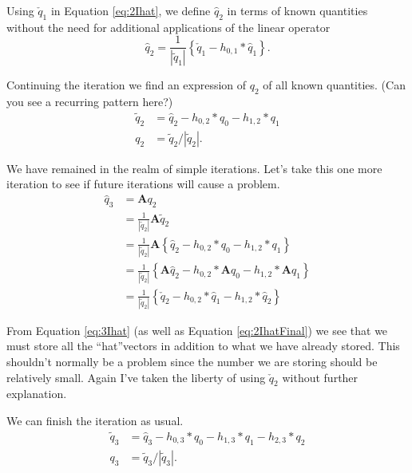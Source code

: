 \documentclass[12pt]{article}
\newcommand{\A}{\mathbf{A}}
\newcommand{\qh}[1]{\hat{q}_{#1}}
\newcommand{\qt}[1]{\tilde{q}_{#1}}
\newcommand{\qc}[1]{\check{q}_{#1}}
\newcommand{\Aq}[1]{\A q_{#1}}
\newcommand{\Ah}[1]{\A \qh{#1}}
\newcommand{\At}[1]{\A \qt{#1}}
\begin{document}
Using $\qc{1}$ in Equation \ref{eq:2Ihat}, we define $\qh{2}$ in terms of known quantities without the need for additional applications of the linear operator
\begin{equation}
    \qh{2} = \frac{1}{\left|\qt{1}\right|} \left\{\qc{1}-h_{0,1}*\qh{1}\right\} 
    \label{eq:2IhatFinal}.
\end{equation}

Continuing the iteration we find an expression of $q_2$ of all known quantities.  (Can you see a recurring pattern here?)
\begin{subequations}
    \begin{align}
        \qt{2} &= \qh{2} - h_{0,2}*q_0 - h_{1,2}*q_1 \\
        q_2 &= \qt{2}/\left|\qt{2}\right|.
    \end{align}
    \label{eq:2I}
\end{subequations}

We have remained in the realm of simple iterations.  Let's take this one more iteration to see if future iterations will cause a problem.
\begin{subequations}
    \begin{align}
    \qh{3} &= \A q_2 \\
    &= \frac{1}{\left|\qt{2}\right|}\At{2} \\
    &= \frac{1}{\left|\qt{2}\right|}\A \left\{\qh{2} - h_{0,2}*q_0 - h_{1,2}*q_1 \right\} \\
    &= \frac{1}{\left|\qt{2}\right|} \left\{\Ah{2} - h_{0,2}*\Aq{0} - h_{1,2}*\Aq{1} \right\} \\
    &= \frac{1}{\left|\qt{2}\right|} \left\{\qc{2} - h_{0,2}*\qh{1} - h_{1,2}*\qh{2} \right\} \label{eq:3Ihat}
    \end{align}
\end{subequations}

From Equation \ref{eq:3Ihat} (as well as Equation \ref{eq:2IhatFinal}) we see that we must store all the ``hat''vectors in addition to what we have already stored.  This shouldn't normally be a problem since the number we are storing should be relatively small.  Again I've taken the liberty of using $\qc{2}$ without further explanation.

We can finish the iteration as usual.
\begin{subequations}
    \begin{align}
    \qt{3} &= \qh{3} - h_{0,3}*q_0 - h_{1,3}*q_1 - h_{2,3}*q_2 \\
    q_3 &= \qt{3}/\left|\qt{3}\right|.
    \end{align}
\end{subequations}
\end{document}
